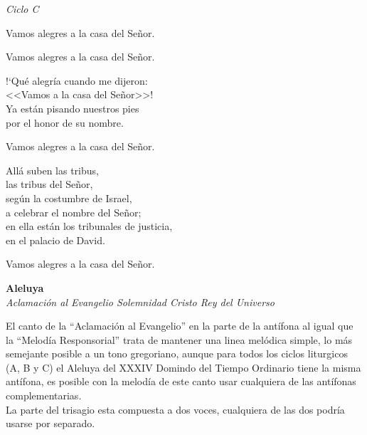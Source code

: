 \documentclass[12pt, letterpaper]{report}
\begin{document}
    \LARGE \textit{Ciclo C}

    \noindent
    \LARGE Vamos alegres a la casa del Se\~nor.

    \noindent
    Vamos alegres a la casa del Se\~nor.

    \noindent
    !`Qu\'e alegr\'ia cuando me dijeron:\\
    <<Vamos a la casa del Se\~nor>>!\\
    Ya est\'an pisando nuestros pies\\
    por el honor de su nombre.

    \noindent
    Vamos alegres a la casa del Se\~nor.

    \noindent
    All\'a suben las tribus,\\
    las tribus del Se\~nor,\\
    seg\'un la costumbre de Israel,\\
    a celebrar el nombre del Se\~nor;\\
    en ella est\'an los tribunales de justicia,\\
    en el palacio de David.

    \noindent
    Vamos alegres a la casa del Se\~nor.
    \clearpage

    {%
\parindent 0pt
\noindent
\ifx\preLilyPondExample \undefined
\else
  \expandafter\preLilyPondExample
\fi
\def\lilypondbook{}%
%
\ifx\postLilyPondExample \undefined
\else
  \expandafter\postLilyPondExample
\fi
}
    \clearpage

    {%
\parindent 0pt
\noindent
\ifx\preLilyPondExample \undefined
\else
  \expandafter\preLilyPondExample
\fi
\def\lilypondbook{}%
%
\ifx\postLilyPondExample \undefined
\else
  \expandafter\postLilyPondExample
\fi
}
    \clearpage

    \begin{center}
      \LARGE \textbf{Aleluya}\\
      \Large \textit{Aclamaci\'on al Evangelio Solemnidad Cristo Rey del Universo}
    \end{center}

    \Large El canto de la ``Aclamaci\'on al Evangelio'' en la parte de la ant\'ifona al igual que la ``Melod\'ia Responsorial'' trata de mantener una linea mel\'odica simple, lo m\'as semejante posible a un tono gregoriano, aunque para todos los ciclos liturgicos (A, B y C) el Aleluya del XXXIV Domindo del Tiempo Ordinario tiene la misma ant\'ifona, es posible con la melod\'ia de este canto usar cualquiera de las ant\'ifonas complementarias.\\
    La parte del trisagio esta compuesta a dos voces, cualquiera de las dos podr\'ia usarse por separado.
\end{document}
